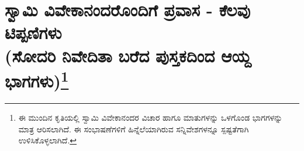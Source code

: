 
\chapter*{ಸ್ವಾಮಿ ವಿವೇಕಾನಂದರೊಂದಿಗೆ ಪ್ರವಾಸ - ಕೆಲವು ಟಿಪ್ಪಣಿಗಳು\\(ಸೋದರಿ ನಿವೇದಿತಾ ಬರೆದ ಪುಸ್ತಕದಿಂದ ಆಯ್ದ ಭಾಗಗಳು)\protect\footnote{ಈ ಮುಂದಿನ ಕೃತಿಯಲ್ಲಿ ಸ್ವಾಮಿ ವಿವೇಕಾನಂದರ ವಿಚಾರ ಹಾಗೂ ಮಾತುಗಳನ್ನು ಒಳಗೊಂಡ ಭಾಗಗಳನ್ನು ಮಾತ್ರ ಆರಿಸಲಾಗಿದೆ. ಈ ಸಂಭಾಷಣೆಗಳಿಗೆ ಹಿನ್ನೆಲೆಯಾಗಿರುವ ಸನ್ನಿವೇಶಗಳನ್ನೂ ಸ್ಪಷ್ಟತೆಗಾಗಿ ಉಳಿಸಿಕೊಳ್ಳಲಾಗಿದೆ.}}

